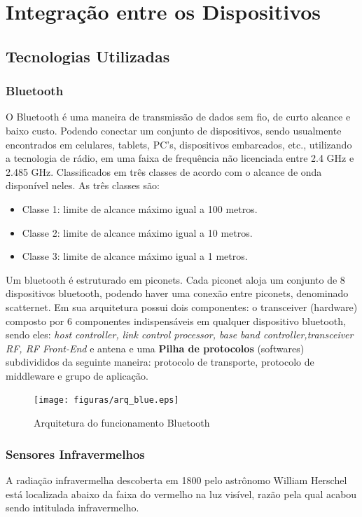 \section{Integração entre os Dispositivos}
\subsection{Tecnologias Utilizadas}
\subsubsection{Bluetooth}
O Bluetooth é uma maneira de transmissão de dados sem fio, de curto alcance e
baixo custo. Podendo conectar um conjunto de dispositivos, sendo usualmente
encontrados em celulares, tablets, PC’s, dispositivos embarcados, etc.,
utilizando a tecnologia de rádio, em uma faixa de frequência não licenciada
entre 2.4 GHz e 2.485 GHz. Classificados em três classes de acordo com o alcance
de onda disponível neles. As três classes são:

\begin{itemize}
  \item Classe 1: limite de alcance máximo igual a 100 metros.
  \item Classe 2: limite de alcance máximo igual a 10 metros.
  \item Classe 3: limite de alcance máximo igual a 1 metros.
\end{itemize}

Um bluetooth é estruturado em piconets. Cada piconet aloja um conjunto de 8
dispositivos bluetooth, podendo haver uma conexão entre piconets, denominado
scatternet. Em sua arquitetura possui dois componentes: o transceiver (hardware)
composto por 6 componentes indispensáveis em qualquer dispositivo bluetooth,
sendo eles: \textit{host controller, link control processor, base band
controller,transceiver RF, RF Front-End} e antena e uma \textbf{Pilha de protocolos}
(softwares) subdivididos da seguinte maneira: protocolo de transporte, protocolo
de middleware e grupo de aplicação.

\begin{figure}[!h]
  \centering
  \texttt{[image: figuras/arq\_blue.eps]}
  \caption{Arquitetura do funcionamento Bluetooth}
\end{figure}


\subsubsection{Sensores Infravermelhos}
A radiação infravermelha descoberta em 1800 pelo astrônomo William Herschel está
localizada abaixo da faixa do vermelho na luz visível, razão pela qual acabou
sendo intitulada infravermelho.


